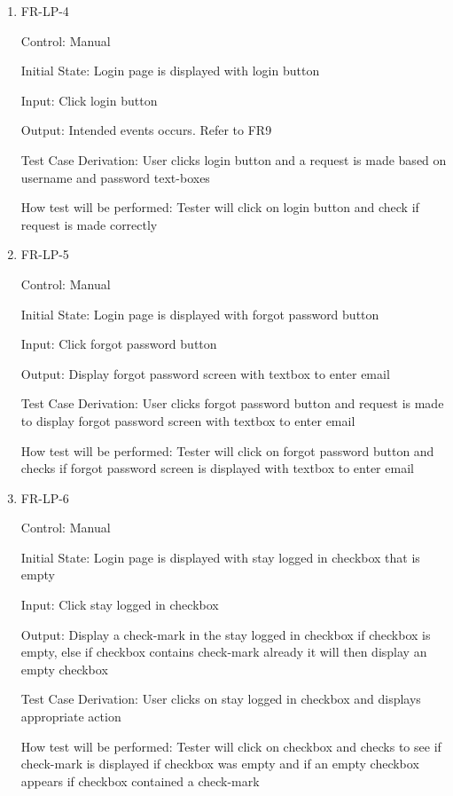 \documentclass[12pt, titlepage]{article}
\begin{document}
\begin{enumerate}
	\item{FR-LP-4\\}
	
	Control: Manual
	
	Initial State: Login page is displayed with login button
	
	Input: Click login button
	
	Output: Intended events occurs. Refer to FR9
	
	Test Case Derivation: User clicks login button and a request is made based on username and password text-boxes
	
	How test will be performed: Tester will click on login button and check if request is made correctly
	
	\item{FR-LP-5\\}
	
	Control: Manual
	
	Initial State: Login page is displayed with forgot password button
	
	Input: Click forgot password button
	
	Output: Display forgot password screen with textbox to enter email
	
	Test Case Derivation: User clicks forgot password button and request is made to display forgot password screen with textbox to enter email
	
	How test will be performed: Tester will click on forgot password button and checks if forgot password screen is displayed with textbox to enter email
	
	\item{FR-LP-6\\}
	
	Control: Manual
	
	Initial State: Login page is displayed with stay logged in checkbox that is empty
	
	Input: Click stay logged in checkbox
	
	Output: Display a check-mark in the stay logged in checkbox if checkbox is empty, else if checkbox contains check-mark already it will then display an empty checkbox
	
	Test Case Derivation: User clicks on stay logged in checkbox and displays appropriate action
	
	How test will be performed: Tester will click on checkbox and checks to see if check-mark is displayed if checkbox was empty and if an empty checkbox appears if checkbox contained a check-mark
	

\end{enumerate}
\end{document}
